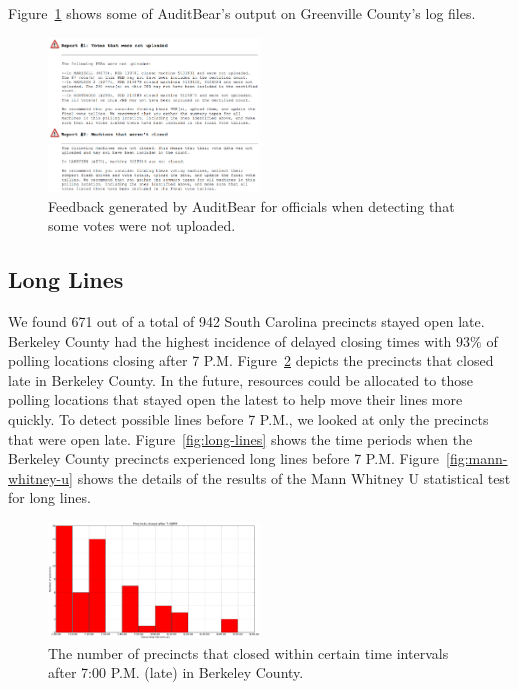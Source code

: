 \documentclass[letterpaper,twocolumn,10pt]{article}
\begin{document}
Figure~\ref{fig:greenville-logs} shows some of AuditBear's output on Greenville
County's log files. 

\begin{figure}[htbp]
\begin{center}
    \includegraphics[width=0.5\textwidth,height=0.3\textheight]{VotesNotUploaded.eps}
\end{center}
\caption{Feedback generated by AuditBear for officials when detecting that some votes were not uploaded.}
\label{fig:greenville-logs}
\end{figure}

\subsection{Long Lines}
We found 671 out of a total of 942 South Carolina precincts stayed open
late. Berkeley County had the highest incidence of delayed closing times with
$93\%$ of polling locations closing after 7
P.M\@. Figure~\ref{fig:precincts-closed-late} depicts the precincts 
that closed late in Berkeley County. In the future, resources could be allocated
to those polling locations that stayed open the latest to help move their lines
more quickly. To detect possible lines before 7 P.M., we looked at only the
precincts that were open late. Figure~\ref{fig:long-lines} shows the time periods
when the Berkeley County precincts experienced long lines before 7
P.M. Figure~\ref{fig:mann-whitney-u} shows the details of the results of the
Mann Whitney U statistical test for long lines.

\begin{figure}[htbp]
\begin{center}
    \includegraphics[width=0.5\textwidth,height=0.3\textheight]{berkeleyopenlate.eps}
\end{center}
\caption{The number of precincts that closed within certain time intervals after 7:00 P.M. (late) in Berkeley County.}
\label{fig:precincts-closed-late}
\end{figure}
\end{document}
